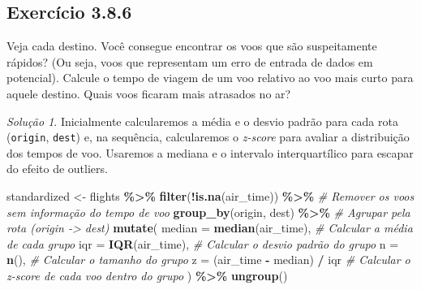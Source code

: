 \documentclass[
]{latex/krantz}
\newenvironment{Shaded}{\begin{snugshade}}{\end{snugshade}}
\newcommand{\AttributeTok}[1]{\textcolor[rgb]{0.13,0.29,0.53}{#1}}
\newcommand{\CommentTok}[1]{\textcolor[rgb]{0.56,0.35,0.01}{\textit{#1}}}
\newcommand{\FunctionTok}[1]{\textcolor[rgb]{0.13,0.29,0.53}{\textbf{#1}}}
\newcommand{\NormalTok}[1]{#1}
\newcommand{\OtherTok}[1]{\textcolor[rgb]{0.56,0.35,0.01}{#1}}
\newcommand{\SpecialCharTok}[1]{\textcolor[rgb]{0.81,0.36,0.00}{\textbf{#1}}}
\theoremstyle{definition}
\theoremstyle{definition}
\theoremstyle{definition}
\theoremstyle{definition}
\theoremstyle{remark}
\newtheorem*{solution}{Solução}
\begin{document}
\hypertarget{exr3-8-6}{%
\subsection*{Exercício 3.8.6}\label{exr3-8-6}}

Veja cada destino. Você consegue encontrar os voos que são suspeitamente rápidos? (Ou seja, voos que representam um erro de entrada de dados em potencial). Calcule o tempo de viagem de um voo relativo ao voo mais curto para aquele destino. Quais voos ficaram mais atrasados no ar?

\begin{solution}
Inicialmente calcularemos a média e o desvio padrão para cada rota (\texttt{origin}, \texttt{dest}) e, na sequência, calcularemos o \emph{z-score} para avaliar a distribuição dos tempos de voo. Usaremos a mediana e o intervalo interquartílico para escapar do efeito de outliers.

\begin{Shaded}
\begin{Highlighting}[]
\NormalTok{standardized }\OtherTok{\textless{}{-}}\NormalTok{ flights }\SpecialCharTok{\%\textgreater{}\%}
    \FunctionTok{filter}\NormalTok{(}\SpecialCharTok{!}\FunctionTok{is.na}\NormalTok{(air\_time)) }\SpecialCharTok{\%\textgreater{}\%}            \CommentTok{\# Remover os voos sem informação do tempo de voo}
    \FunctionTok{group\_by}\NormalTok{(origin, dest) }\SpecialCharTok{\%\textgreater{}\%}              \CommentTok{\# Agrupar pela rota (origin {-}\textgreater{} dest)}
    \FunctionTok{mutate}\NormalTok{(}
        \AttributeTok{median =} \FunctionTok{median}\NormalTok{(air\_time),          }\CommentTok{\# Calcular a média de cada grupo}
        \AttributeTok{iqr =} \FunctionTok{IQR}\NormalTok{(air\_time),                }\CommentTok{\# Calcular o desvio padrão do grupo}
        \AttributeTok{n =} \FunctionTok{n}\NormalTok{(),                            }\CommentTok{\# Calcular o tamanho do grupo}
        \AttributeTok{z =}\NormalTok{ (air\_time }\SpecialCharTok{{-}}\NormalTok{ median) }\SpecialCharTok{/}\NormalTok{ iqr       }\CommentTok{\# Calcular o z{-}score de cada voo dentro do grupo}
\NormalTok{    ) }\SpecialCharTok{\%\textgreater{}\%}
    \FunctionTok{ungroup}\NormalTok{()}


\end{Highlighting}
\end{Shaded}
\end{solution}
\end{document}
